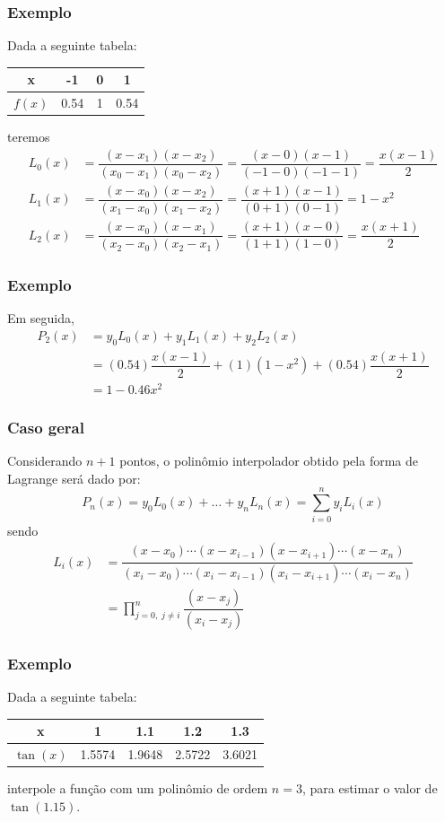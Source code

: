 \documentclass{beamer}
\theoremstyle{mystyle}
\begin{document}
\begin{frame}
	\frametitle{Exemplo}
	Dada a seguinte tabela:
	\begin{table}
		\centering
		\begin{tabular}{c|ccc}
			x & -1 & 0 & 1  \\
			\hline
			\hline
			$ f(x) $ & 0.54 & 1 & 0.54
		\end{tabular}
	\end{table}
	teremos
	\begin{align*}
		L_{0}(x) &=  \dfrac{(x - x_{1})(x - x_{2})}{(x_{0} - x_{1})(x_{0} - x_{2})} = \dfrac{(x - 0)(x - 1)}{(-1 - 0)(-1 - 1)} = \dfrac{x(x - 1)}{2}\\
		L_{1}(x) &=  \dfrac{(x - x_{0})(x - x_{2})}{(x_{1} - x_{0})(x_{1} - x_{2})} = \dfrac{(x + 1)(x - 1)}{(0 + 1)(0 - 1)} = 1 - x^{2}\\
		L_{2}(x) &=  \dfrac{(x - x_{0})(x - x_{1})}{(x_{2} - x_{0})(x_{2} - x_{1})} =  \dfrac{(x + 1)(x - 0)}{(1 + 1)(1 - 0)} =  \dfrac{x(x + 1)}{2}
	\end{align*}
\end{frame}

\begin{frame}
	\frametitle{Exemplo}
	Em seguida, 
	\begin{align*}
			P_{2}(x) &= y_{0}L_{0}(x) + y_{1}L_{1}(x) + y_{2}L_{2}(x)\\
			&= (0.54)\dfrac{x(x - 1)}{2} + (1)(1 - x^{2}) + (0.54)\dfrac{x(x + 1)}{2}\\
			&= 1 - 0.46x^{2}
	\end{align*}
\end{frame}

\begin{frame}
	\frametitle{Caso geral}
	Considerando $ n + 1 $ pontos, o polinômio interpolador obtido pela forma de Lagrange será dado por:
	\begin{equation*}
		P_{n}(x) = y_{0}L_{0}(x) + \ldots + y_{n}L_{n}(x) = \sum_{i=0}^{n} y_{i}L_{i}(x)
	\end{equation*}
	sendo
	\begin{align*}
		L_{i}(x) & =  \dfrac{(x - x_{0})\cdots(x - x_{i-1})(x - x_{i+1})\cdots(x - x_{n})}{(x_{i} - x_{0})\cdots(x_{i} - x_{i-1})(x_{i} - x_{i+1})\cdots(x_{i} - x_{n})}\\
		 & = \prod_{j=0,\; j\neq i}^{n}\dfrac{(x - x_{j})}{(x_{i} - x_{j})}
	\end{align*}
\end{frame}

\begin{frame}
	\frametitle{Exemplo}
	Dada a seguinte tabela:
	\begin{table}
		\centering
		\begin{tabular}{c|cccc}
			x & 1 & 1.1 & 1.2 & 1.3 \\
			\hline
			\hline
			$ \tan(x) $ & 1.5574 & 1.9648 & 2.5722 & 3.6021 
		\end{tabular}
	\end{table}
	interpole a função com um polinômio de ordem $ n = 3 $, para estimar o valor de $ \tan(1.15) $.
\end{frame}
\end{document}
